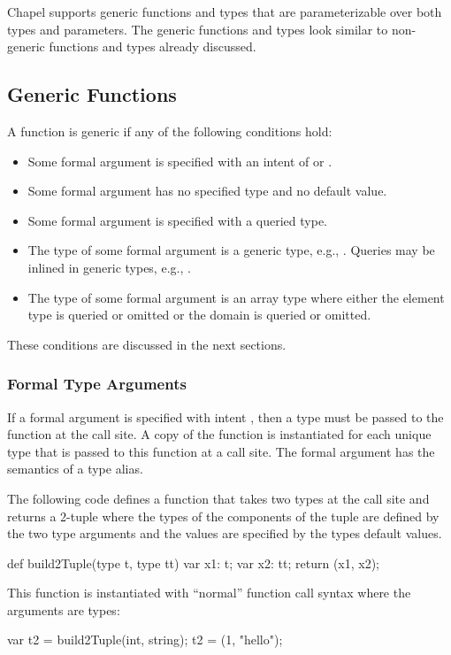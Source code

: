 \label{Generics}

Chapel supports generic functions and types that are parameterizable
over both types and parameters.  The generic functions and types look
similar to non-generic functions and types already discussed.

\subsection{Generic Functions}
\label{Generic_Functions}

A function is generic if any of the following conditions hold:
\begin{itemize}
\item
Some formal argument is specified with an intent of  or
.
\item
Some formal argument has no specified type and no default value.
\item
Some formal argument is specified with a queried type.
\item
The type of some formal argument is a generic type, e.g., .
Queries may be inlined in generic types, e.g., .
\item
The type of some formal argument is an array type where either the
element type is queried or omitted or the domain is queried or
omitted.
\end{itemize}
These conditions are discussed in the next sections.

\subsubsection{Formal Type Arguments}
\label{Formal_Type_Arguments}

If a formal argument is specified with intent , then a type
must be passed to the function at the call site.  A copy of the
function is instantiated for each unique type that is passed to this
function at a call site.  The formal argument has the semantics of a
type alias.
\begin{example}
The following code defines a function that takes two types at the call
site and returns a 2-tuple where the types of the components of the
tuple are defined by the two type arguments and the values are
specified by the types default values.
\begin{chapel}
def build2Tuple(type t, type tt) {
  var x1: t;
  var x2: tt;
  return (x1, x2);
}
\end{chapel}
This function is instantiated with ``normal'' function call syntax
where the arguments are types:
\begin{chapel}
var t2 = build2Tuple(int, string);
t2 = (1, "hello");
\end{chapel}
\end{example}

